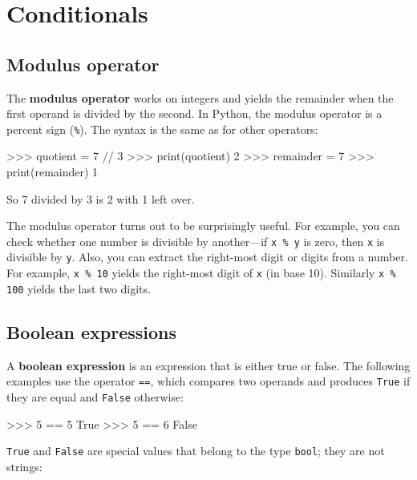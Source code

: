 \chapter{Conditionals}

\section{Modulus operator}


The {\bf modulus operator} works on integers and yields the remainder
when the first operand is divided by the second.  In Python, the
modulus operator is a percent sign (\verb"%").  The syntax is the same
as for other operators:

\beforeverb
\begin{pycode}
>>> quotient = 7 // 3
>>> print(quotient)
2
>>> remainder = 7 %
>>> print(remainder)
1
\end{pycode}
\afterverb
%
So 7 divided by 3 is 2 with 1 left over.

The modulus operator turns out to be surprisingly useful.  For
example, you can check whether one number is divisible by another---if
{\tt x \% y} is zero, then {\tt x} is divisible by {\tt y}.
%
%
Also, you can extract the right-most digit
or digits from a number.  For example, {\tt x \% 10} yields the
right-most digit of {\tt x} (in base 10).  Similarly {\tt x \% 100}
yields the last two digits.


\section{Boolean expressions}

A {\bf boolean expression} is an expression that is either true
or false.  The following examples use the 
operator {\tt ==}, which compares two operands and produces
{\tt True} if they are equal and {\tt False} otherwise:

\beforeverb
\begin{pycode}
>>> 5 == 5
True
>>> 5 == 6
False
\end{pycode}
\afterverb
%
{\tt True} and {\tt False} are special
values that belong to the type {\tt bool}; they are not strings:


